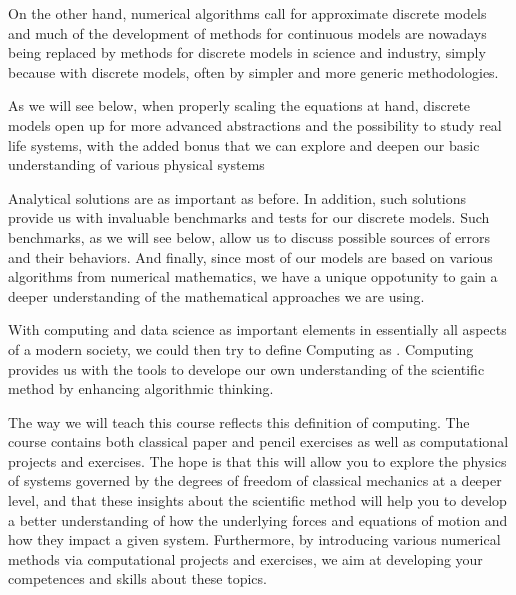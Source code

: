 \documentclass[letterpaper,10pt,english]{sphinxmanual}
\begin{document}
On the other hand, numerical algorithms call for approximate discrete
models and much of the development of methods for continuous models
are nowadays being replaced by methods for discrete models in science and
industry, simply because  with discrete models, often  by simpler and more
generic methodologies.

As we will see below, when properly scaling the equations at hand,
discrete models open up for more advanced abstractions and the possibility to
study  real life systems, with the added bonus that we can explore and
deepen our basic understanding of various physical systems

Analytical solutions are as important as before. In addition, such
solutions provide us with invaluable benchmarks and tests for our
discrete models. Such benchmarks, as we will see below, allow us
to discuss possible sources of errors and their behaviors.  And
finally, since most of our models are based on various algorithms from
numerical mathematics, we have a unique oppotunity to gain a deeper
understanding of the mathematical approaches we are using.

With computing and data science as important elements in essentially
all aspects of a modern society, we could  then try to define Computing as
.
Computing provides us with the tools to develope our own understanding of the scientific method by enhancing algorithmic thinking.

The way we will teach this course reflects
this definition of computing. The course contains both classical paper
and pencil exercises as well as  computational projects and exercises. The
hope is that this will allow you to explore the physics of systems
governed by the degrees of freedom of classical mechanics at a deeper
level, and that these insights about the scientific method will help
you to develop a better understanding of how the underlying forces and
equations of motion and how they impact a given system. Furthermore, by introducing various numerical methods
via computational projects and exercises, we aim at developing your competences and skills about these topics.
\end{document}
